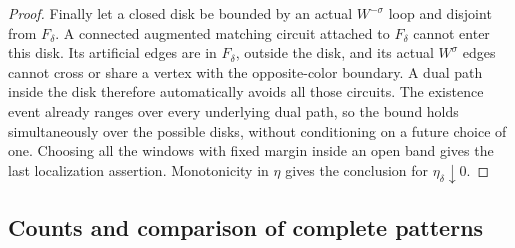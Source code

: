 \begin{proof}
Finally let a closed disk be bounded by an actual $W^{-\sigma}$ loop
and disjoint from $F_\delta$. A connected augmented matching circuit
attached to $F_\delta$ cannot enter this disk. Its artificial edges
are in $F_\delta$, outside the disk, and its actual $W^\sigma$ edges
cannot cross or share a vertex with the opposite-color boundary.
A dual path inside the disk therefore automatically avoids all those
circuits. The existence event already ranges over every underlying
dual path, so the bound holds simultaneously over the possible disks,
without conditioning on a future choice of one. Choosing all the
windows with fixed margin inside an open band gives the last
localization assertion. Monotonicity in $\eta$ gives the conclusion
for $\eta_\delta\downarrow0$.
\end{proof}

\subsection{Counts and comparison of complete patterns}

